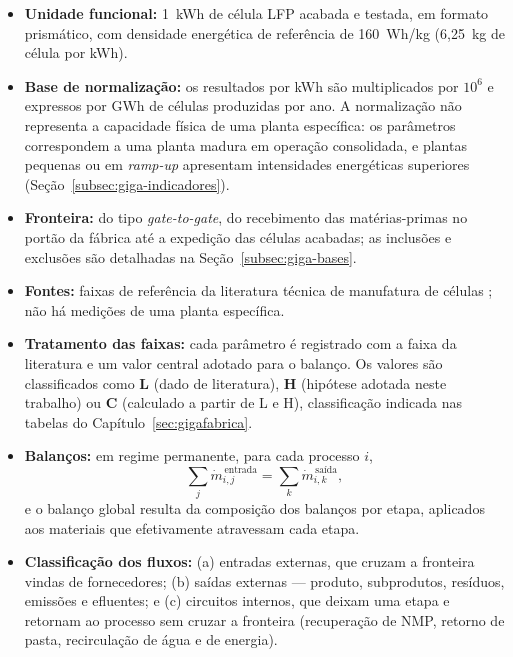 \begin{itemize}
    \item \textbf{Unidade funcional:} 1~kWh de célula LFP acabada e testada, em
    formato prismático, com densidade energética de referência de 160~Wh/kg
    (6,25~kg de célula por kWh).

    \item \textbf{Base de normalização:} os resultados por kWh são multiplicados
    por $10^{6}$ e expressos por GWh de células produzidas por ano. A
    normalização não representa a capacidade física de uma planta específica: os
    parâmetros correspondem a uma planta madura em operação consolidada, e plantas
    pequenas ou em \textit{ramp-up} apresentam intensidades energéticas superiores
    (Seção~\ref{subsec:giga-indicadores}).

    \item \textbf{Fronteira:} do tipo \textit{gate-to-gate}, do recebimento das
    matérias-primas no portão da fábrica até a expedição das células acabadas; as
    inclusões e exclusões são detalhadas na Seção~\ref{subsec:giga-bases}.

    \item \textbf{Fontes:} faixas de referência da literatura técnica de
    manufatura de células \cite{knehr2022batpac,degen2022,erakca2021,dai2019};
    não há medições de uma planta específica.

    \item \textbf{Tratamento das faixas:} cada parâmetro é registrado com a faixa
    da literatura e um valor central adotado para o balanço. Os valores são
    classificados como \textbf{L} (dado de literatura), \textbf{H} (hipótese
    adotada neste trabalho) ou \textbf{C} (calculado a partir de L e H),
    classificação indicada nas tabelas do Capítulo~\ref{sec:gigafabrica}.

    \item \textbf{Balanços:} em regime permanente, para cada processo $i$,
    \begin{equation}
        \sum_{j} \dot{m}^{\,\text{entrada}}_{i,j} = \sum_{k} \dot{m}^{\,\text{saída}}_{i,k},
        \label{eq:balanco}
    \end{equation}
    e o balanço global resulta da composição dos balanços por etapa, aplicados aos
    materiais que efetivamente atravessam cada etapa.

    \item \textbf{Classificação dos fluxos:} (a) entradas externas, que cruzam a
    fronteira vindas de fornecedores; (b) saídas externas — produto, subprodutos,
    resíduos, emissões e efluentes; e (c) circuitos internos, que deixam uma
    etapa e retornam ao processo sem cruzar a fronteira (recuperação de NMP,
    retorno de pasta, recirculação de água e de energia).
\end{itemize}

